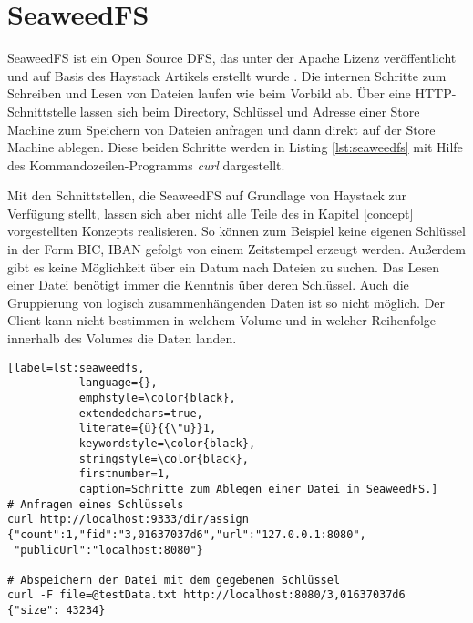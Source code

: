 \documentclass[12pt,oneside,a4paper,parskip]{scrbook}
\begin{document}
\section{SeaweedFS}
SeaweedFS ist ein Open Source DFS, das unter der Apache Lizenz veröffentlicht und auf Basis des Haystack Artikels erstellt wurde \cite{seaweedfsRepo}. Die internen Schritte zum Schreiben und Lesen von Dateien laufen wie beim Vorbild ab. Über eine HTTP-Schnittstelle lassen sich beim Directory, Schlüssel und Adresse einer Store Machine zum Speichern von Dateien anfragen und dann direkt auf der Store Machine ablegen. Diese beiden Schritte werden in Listing \ref{lst:seaweedfs} mit Hilfe des Kommandozeilen-Programms \textit{curl} dargestellt. 

Mit den Schnittstellen, die SeaweedFS auf Grundlage von Haystack zur Verfügung stellt, lassen sich aber nicht alle Teile des in Kapitel \ref{concept} vorgestellten Konzepts realisieren. So können zum Beispiel keine eigenen Schlüssel in der Form BIC, IBAN gefolgt von einem Zeitstempel erzeugt werden. Außerdem gibt es keine Möglichkeit über ein Datum nach Dateien zu suchen. Das Lesen einer Datei benötigt immer die Kenntnis über deren Schlüssel. Auch die Gruppierung von logisch zusammenhängenden Daten ist so nicht möglich. Der Client kann nicht bestimmen in welchem Volume und in welcher Reihenfolge innerhalb des Volumes die Daten landen.

\begin{minipage}{\linewidth}
\begin{lstlisting}[label=lst:seaweedfs,
           language={},
           emphstyle=\color{black},
           extendedchars=true,
           literate={ü}{{\"u}}1,
           keywordstyle=\color{black},
           stringstyle=\color{black},
           firstnumber=1,
           caption=Schritte zum Ablegen einer Datei in SeaweedFS.]           
# Anfragen eines Schlüssels
curl http://localhost:9333/dir/assign
{"count":1,"fid":"3,01637037d6","url":"127.0.0.1:8080",
 "publicUrl":"localhost:8080"}

# Abspeichern der Datei mit dem gegebenen Schlüssel
curl -F file=@testData.txt http://localhost:8080/3,01637037d6
{"size": 43234}
\end{lstlisting}
\end{minipage}
\end{document}

